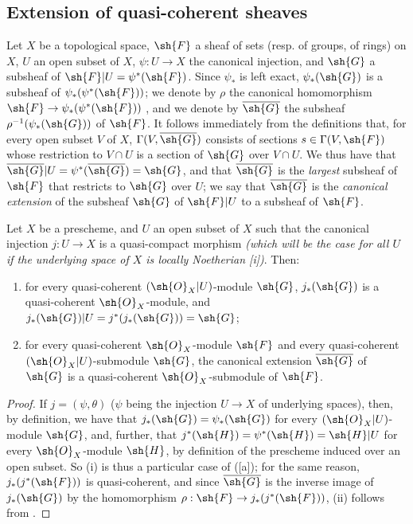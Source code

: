 \subsection{Extension of quasi-coherent sheaves}
\label{subsection:I.9.4}

\begin{env}[9.4.1]
\label{I.9.4.1}
Let
$X$ be a topological space, $\sh{F}$ a sheaf of sets (resp. of groups, of rings) on $X$, $U$
an open subset of $X$, $\psi:U\to X$ the canonical injection, and $\sh{G}$ a subsheaf of
$\sh{F}|U=\psi^*(\sh{F})$. Since $\psi_*$ is left exact, $\psi_*(\sh{G})$ is a subsheaf of
$\psi_*(\psi^*(\sh{F}))$; we denote by $\rho$ the canonical homomorphism
$\sh{F}\to\psi_*(\psi^*(\sh{F}))$ , and we denote by $\overline{\sh{G}}$
the subsheaf $\rho^{-1}(\psi_*(\sh{G}))$ of $\sh{F}$. It follows immediately from the
definitions that, for every open subset $V$ of $X$, $\Gamma(V,\overline{\sh{G}})$ consists of
sections $s\in\Gamma(V,\sh{F})$ whose restriction to $V\cap U$ is a section of $\sh{G}$ over
$V\cap U$. We thus have that $\overline{\sh{G}}|U=\psi^*(\overline{\sh{G}})=\sh{G}$, and that
$\overline{\sh{G}}$ is the \emph{largest} subsheaf of $\sh{F}$ that restricts to $\sh{G}$
over $U$; we say that $\overline{\sh{G}}$ is the \emph{canonical extension} of the subsheaf
$\sh{G}$ of $\sh{F}|U$ to a subsheaf of $\sh{F}$.
\end{env}

\begin{proposition}[9.4.2]
\label{I.9.4.2}
Let $X$ be a prescheme, and $U$ an open subset of $X$ such that the canonical injection
$j:U\to X$ is a quasi-compact morphism \emph{(which will be the case for \emph{all} $U$ if
the underlying space of $X$ is \emph{locally Noetherian}
[i])}. Then:
\begin{enumerate}
  \item[{\rm(i)}] for every quasi-coherent $(\sh{O}_X|U)$-module $\sh{G}$, $j_*(\sh{G})$
    is a quasi-coherent $\sh{O}_X$-module, and $j_*(\sh{G})|U=j^*(j_*(\sh{G}))=\sh{G}$;
  \item[{\rm(ii)}] for every quasi-coherent $\sh{O}_X$-module $\sh{F}$ and every quasi-coherent
    $(\sh{O}_X|U)$-submodule $\sh{G}$, the canonical extension
    $\overline{\sh{G}}$ of $\sh{G}$  is a
    quasi-coherent $\sh{O}_X$-submodule of $\sh{F}$.
\end{enumerate}
\end{proposition}

\begin{proof}
If $j=(\psi,\theta)$ ($\psi$ being the injection $U\to X$ of underlying spaces), then, by
definition, we have that $j_*(\sh{G})=\psi_*(\sh{G})$ for every $(\sh{O}_X|U)$-module $\sh{G}$,
and, further, that $j^*(\sh{H})=\psi^*(\sh{H})=\sh{H}|U$ for every $\sh{O}_X$-module $\sh{H}$,
by definition of the prescheme induced over an open subset. So (i) is thus a particular case
of ([a]); for the same reason, $j_*(j^*(\sh{F}))$ is quasi-coherent, and
since $\overline{\sh{G}}$ is the inverse image of $j_*(\sh{G})$ by the homomorphism
$\rho:\sh{F}\to j_*(j^*(\sh{F}))$, (ii) follows from .
\end{proof}

